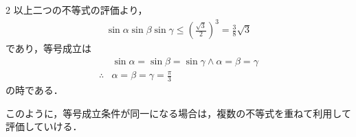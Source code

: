 \documentclass[../../../../main.tex]{subfiles}
\begin{document}
\begin{multicols}{2}
  以上二つの不等式の評価より，
  \begin{align*}
    \sin\alpha\sin\beta\sin\gamma \le \left(\frac{\sqrt{3}}{2}\right)^3 = \frac{3}{8}\sqrt{3}
  \end{align*}
  であり，等号成立は
  \begin{align*}
     & \sin\alpha=\sin\beta=\sin\gamma \land \alpha=\beta=\gamma \\
    \therefore
     & \alpha=\beta=\gamma = \frac{\pi}{3}
  \end{align*}
  の時である．

  このように，等号成立条件が同一になる場合は，複数の不等式を重ねて利用して評価していける．

  \newpage
\end{multicols}
\end{document}
